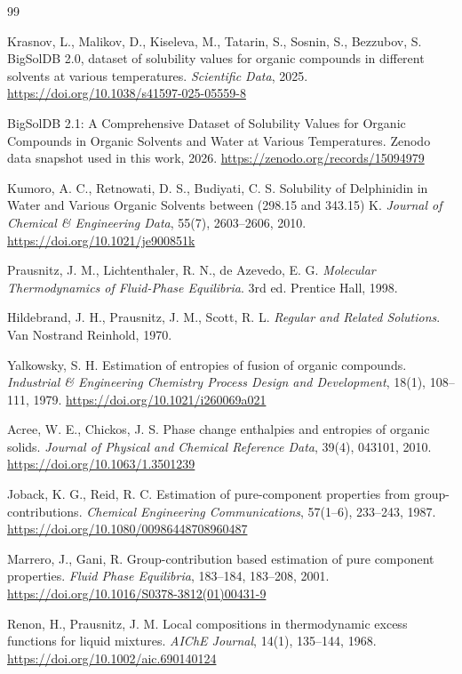 \documentclass[11pt]{article}
\theoremstyle{definition}
\begin{document}
\begin{thebibliography}{99}

 Krasnov, L., Malikov, D., Kiseleva, M., Tatarin, S., Sosnin, S., Bezzubov, S. BigSolDB 2.0, dataset of solubility values for organic compounds in different solvents at various temperatures. \textit{Scientific Data}, 2025. \url{https://doi.org/10.1038/s41597-025-05559-8}

 BigSolDB 2.1: A Comprehensive Dataset of Solubility Values for Organic Compounds in Organic Solvents and Water at Various Temperatures. Zenodo data snapshot used in this work, 2026. \url{https://zenodo.org/records/15094979}

 Kumoro, A. C., Retnowati, D. S., Budiyati, C. S. Solubility of Delphinidin in Water and Various Organic Solvents between (298.15 and 343.15) K. \textit{Journal of Chemical \& Engineering Data}, 55(7), 2603--2606, 2010. \url{https://doi.org/10.1021/je900851k}

 Prausnitz, J. M., Lichtenthaler, R. N., de Azevedo, E. G. \textit{Molecular Thermodynamics of Fluid-Phase Equilibria}. 3rd ed. Prentice Hall, 1998.

 Hildebrand, J. H., Prausnitz, J. M., Scott, R. L. \textit{Regular and Related Solutions}. Van Nostrand Reinhold, 1970.

 Yalkowsky, S. H. Estimation of entropies of fusion of organic compounds. \textit{Industrial \& Engineering Chemistry Process Design and Development}, 18(1), 108--111, 1979. \url{https://doi.org/10.1021/i260069a021}

 Acree, W. E., Chickos, J. S. Phase change enthalpies and entropies of organic solids. \textit{Journal of Physical and Chemical Reference Data}, 39(4), 043101, 2010. \url{https://doi.org/10.1063/1.3501239}

 Joback, K. G., Reid, R. C. Estimation of pure-component properties from group-contributions. \textit{Chemical Engineering Communications}, 57(1--6), 233--243, 1987. \url{https://doi.org/10.1080/00986448708960487}

 Marrero, J., Gani, R. Group-contribution based estimation of pure component properties. \textit{Fluid Phase Equilibria}, 183--184, 183--208, 2001. \url{https://doi.org/10.1016/S0378-3812(01)00431-9}

 Renon, H., Prausnitz, J. M. Local compositions in thermodynamic excess functions for liquid mixtures. \textit{AIChE Journal}, 14(1), 135--144, 1968. \url{https://doi.org/10.1002/aic.690140124}


\end{thebibliography}
\end{document}
